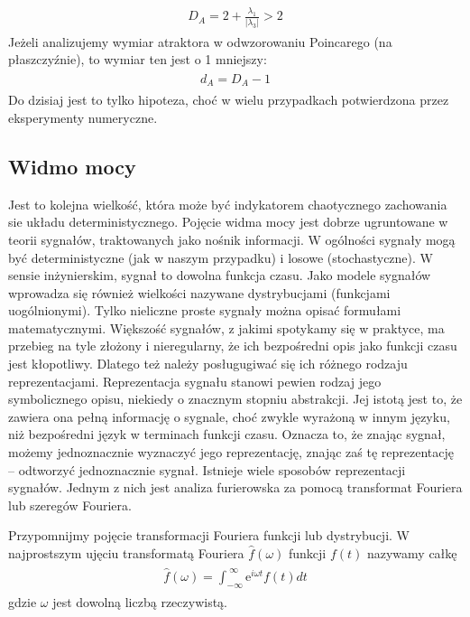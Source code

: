 \documentclass[a4paper,12pt,polish]{sphinxmanual}
\begin{document}
\label{ch2/chII012:equation-eqn18}\begin{gather}
\begin{split} D_A = 2 +  \frac{\lambda_1}{|\lambda_3|}  >  2\end{split}\label{ch2/chII012-eqn18}
\end{gather}
Jeżeli analizujemy wymiar atraktora w odwzorowaniu Poincarego (na płaszczyźnie), to wymiar ten jest o 1 mniejszy:
\label{ch2/chII012:equation-eqn19}\begin{gather}
\begin{split}d_A = D_A -1\end{split}\label{ch2/chII012-eqn19}
\end{gather}
Do dzisiaj jest to tylko hipoteza, choć w wielu przypadkach potwierdzona przez eksperymenty numeryczne.


\subsection{Widmo mocy}
\label{ch2/chII012:widmo-mocy}
Jest to kolejna wielkość, która może być indykatorem chaotycznego zachowania sie układu deterministycznego. Pojęcie widma mocy jest dobrze ugruntowane w teorii sygnałów, traktowanych jako nośnik informacji. W ogólności sygnały mogą być deterministyczne (jak w naszym przypadku) i losowe (stochastyczne). W sensie inżynierskim, sygnał to dowolna funkcja czasu.  Jako modele sygnałów wprowadza się również wielkości nazywane dystrybucjami (funkcjami uogólnionymi). Tylko  nieliczne proste sygnały można opisać formułami matematycznymi.  Większość sygnałów, z jakimi spotykamy się w praktyce, ma przebieg na tyle złożony i nieregularny, że ich bezpośredni opis  jako funkcji czasu jest kłopotliwy.  Dlatego też należy posługugiwać się  ich różnego rodzaju reprezentacjami. Reprezentacja sygnału stanowi pewien rodzaj jego symbolicznego opisu, niekiedy o znacznym stopniu abstrakcji. Jej istotą jest to, że zawiera ona pełną informację o sygnale, choć zwykle wyrażoną w innym języku, niż bezpośredni język  w terminach funkcji czasu.  Oznacza to, że znając sygnał, możemy jednoznacznie wyznaczyć jego reprezentację, znając zaś tę reprezentację – odtworzyć jednoznacznie sygnał. Istnieje wiele sposobów reprezentacji sygnałów. Jednym z nich jest analiza furierowska za pomocą transformat Fouriera lub szeregów Fouriera.

Przypomnijmy pojęcie transformacji Fouriera funkcji lub dystrybucji. W najprostszym ujęciu transformatą  Fouriera ${\hat f}(\omega)$  funkcji $f(t)$ nazywamy całkę
\label{ch2/chII012:equation-eqn20}\begin{gather}
\begin{split}{\hat f}(\omega) = \int_{-\infty}^{\; \infty}  \mbox{e}^{i \omega t} f(t)  dt\end{split}\label{ch2/chII012-eqn20}
\end{gather}
gdzie $\omega$ jest dowolną liczbą rzeczywistą.
\end{document}
